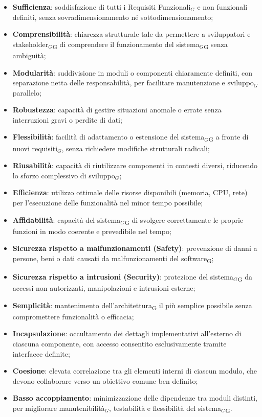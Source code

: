 \documentclass[a4paper, 10pt]{article}
\begin{document}
\begin{itemize}
    \item \textbf{Sufficienza}: soddisfazione di tutti i Requisiti Funzionali$_G$ e non funzionali definiti, senza sovradimensionamento né sottodimensionamento;
    \item \textbf{Comprensibilità}: chiarezza strutturale tale da permettere a sviluppatori e stakeholder$_G$\textsubscript{G} di comprendere il funzionamento del sistema$_G$\textsubscript{G} senza ambiguità;
    \item \textbf{Modularità}: suddivisione in moduli o componenti chiaramente definiti, con separazione netta delle responsabilità, per facilitare manutenzione e sviluppo$_G$ parallelo;
    \item \textbf{Robustezza}: capacità di gestire situazioni anomale o errate senza interruzioni gravi o perdite di dati;
    \item \textbf{Flessibilità}: facilità di adattamento o estensione del sistema$_G$\textsubscript{G} a fronte di nuovi requisiti$_G$, senza richiedere modifiche strutturali radicali;
    \item \textbf{Riusabilità}: capacità di riutilizzare componenti in contesti diversi, riducendo lo sforzo complessivo di sviluppo$_G$;
    \item \textbf{Efficienza}: utilizzo ottimale delle risorse disponibili (memoria, CPU, rete) per l'esecuzione delle funzionalità nel minor tempo possibile;
    \item \textbf{Affidabilità}: capacità del sistema$_G$\textsubscript{G} di svolgere correttamente le proprie funzioni in modo coerente e prevedibile nel tempo;
    \item \textbf{Sicurezza rispetto a malfunzionamenti (Safety)}: prevenzione di danni a persone, beni o dati causati da malfunzionamenti del software\textsubscript{G};
    \item \textbf{Sicurezza rispetto a intrusioni (Security)}: protezione del sistema$_G$\textsubscript{G} da accessi non autorizzati, manipolazioni e intrusioni esterne;
    \item \textbf{Semplicità}: mantenimento dell'architettura\textsubscript{G} il più semplice possibile senza compromettere funzionalità o efficacia;
    \item \textbf{Incapsulazione}: occultamento dei dettagli implementativi all'esterno di ciascuna componente, con accesso consentito esclusivamente tramite interfacce definite;
    \item \textbf{Coesione}: elevata correlazione tra gli elementi interni di ciascun modulo, che devono collaborare verso un obiettivo comune ben definito;
    \item \textbf{Basso accoppiamento}: minimizzazione delle dipendenze tra moduli distinti, per migliorare manutenibilità$_G$, testabilità e flessibilità del sistema$_G$\textsubscript{G}.
\end{itemize}
\end{document}
